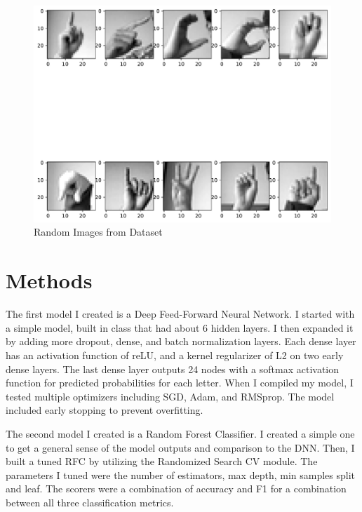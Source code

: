 \documentclass[
  letterpaper,
  DIV=11,
  numbers=noendperiod]{scrartcl}
\begin{document}
\begin{figure}

{\centering \includegraphics{HW2_Reflection_files/figure-pdf/random-images-from-dataset-output-2.pdf}

}

\caption{Random Images from Dataset}

\end{figure}%

\section{Methods}\label{methods}

The first model I created is a Deep Feed-Forward Neural Network. I
started with a simple model, built in class that had about 6 hidden
layers. I then expanded it by adding more dropout, dense, and batch
normalization layers. Each dense layer has an activation function of
reLU, and a kernel regularizer of L2 on two early dense layers. The last
dense layer outputs 24 nodes with a softmax activation function for
predicted probabilities for each letter. When I compiled my model, I
tested multiple optimizers including SGD, Adam, and RMSprop. The model
included early stopping to prevent overfitting.

The second model I created is a Random Forest Classifier. I created a
simple one to get a general sense of the model outputs and comparison to
the DNN. Then, I built a tuned RFC by utilizing the Randomized Search CV
module. The parameters I tuned were the number of estimators, max depth,
min samples split and leaf. The scorers were a combination of accuracy
and F1 for a combination between all three classification metrics.
\end{document}
